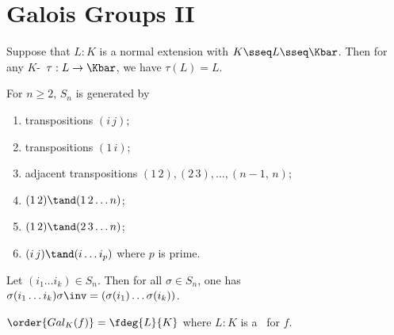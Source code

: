 \documentclass[a4paper]{article}
\begin{document}
\section{Galois Groups II}
\begin{tlemma}
  Suppose that \( L:K \) is a normal extension with \( K\sseq L\sseq \Kbar \).
  Then for any \( K \)-\homo~\( \tau:L\to \Kbar \), we have \( \tau(L) = L \).
\end{tlemma}

\begin{tlemma}
  For \( n\geq 2 \), \( S_n \) is generated by \begin{enumerate}
    \item transpositions \( (i\,j) \);
    \item transpositions \( (1\,i) \);
    \item adjacent transpositions \( (1\,2),(2\,3),\ldots,(n-1,\, n) \);
    \item \( (1\,2)\tand (1\,2\ldots n) \);
    \item \( (1\,2)\tand (2\,3\ldots n) \);
    \item \( (i\,j)\tand (i\ldots i_p) \) where \( p \) is prime.
  \end{enumerate}
\end{tlemma}

\begin{tlemma}
  Let \( (i_1\ldots i_k)\in S_n \).
  Then for all \( \sigma\in S_n \), one has \( \sigma(i_1\ldots i_k)\sigma\inv = (\sigma(i_1)\ldots\sigma(i_k)) \).
\end{tlemma}

\quad \( \order{Gal_K(f)} = \fdeg{L}{K} \) where \( L:K \) is a \sfe~for \( f \).
\end{document}
